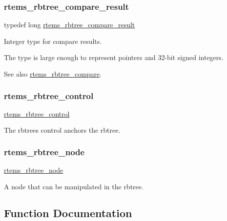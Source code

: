 \subsubsection{\texorpdfstring{rtems\_rbtree\_compare\_result}{rtems\_rbtree\_compare\_result}}
{\footnotesize\ttfamily typedef long \mbox{\hyperlink{group__ClassicRBTrees_gaf0f8f451a211561514907b1dc47a6d9d}{rtems\+\_\+rbtree\+\_\+compare\+\_\+result}}}



Integer type for compare results. 

The type is large enough to represent pointers and 32-\/bit signed integers.

\begin{DoxySeeAlso}{See also}
\mbox{\hyperlink{group__ClassicRBTrees_gae5f1cdaef7551cbee5a877e65f442b93}{rtems\+\_\+rbtree\+\_\+compare}}. 
\end{DoxySeeAlso}
\mbox{\label{group__ClassicRBTrees_ga21fe446d0b3cb8b25c814e93357753ef}} 
\subsubsection{\texorpdfstring{rtems\_rbtree\_control}{rtems\_rbtree\_control}}
{\footnotesize\ttfamily \mbox{\hyperlink{group__ClassicRBTrees_ga21fe446d0b3cb8b25c814e93357753ef}{rtems\+\_\+rbtree\+\_\+control}}}

The rbtree\textquotesingle{}s control anchors the rbtree. \mbox{\label{group__ClassicRBTrees_gaef47fc7fc61856c9afbf7f18a26ff80d}} 
\subsubsection{\texorpdfstring{rtems\_rbtree\_node}{rtems\_rbtree\_node}}
{\footnotesize\ttfamily \mbox{\hyperlink{group__ClassicRBTrees_gaef47fc7fc61856c9afbf7f18a26ff80d}{rtems\+\_\+rbtree\+\_\+node}}}

A node that can be manipulated in the rbtree. 

\subsection{Function Documentation}
\mbox{\label{group__ClassicRBTrees_gac42d79ad499c2243f75ebdb4df3edb5c}} 

